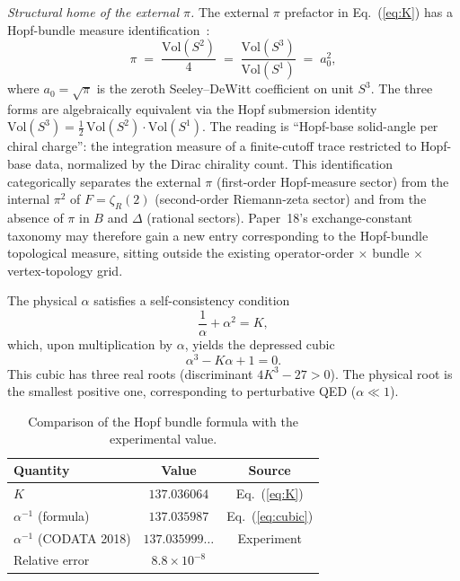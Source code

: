 \documentclass[aps,prl,twocolumn,superscriptaddress]{revtex4-2}
\begin{document}
\emph{Structural home of the external $\pi$.} The external $\pi$
prefactor in Eq.~(\ref{eq:K}) has a Hopf-bundle measure
identification~\cite{alpha_sprint_a_memo}:
\begin{equation}\label{eq:pi_hopf_measure}
  \pi \;=\; \frac{\mathrm{Vol}(S^2)}{4}
         \;=\; \frac{\mathrm{Vol}(S^3)}{\mathrm{Vol}(S^1)}
         \;=\; a_0^{2},
\end{equation}
where $a_0 = \sqrt{\pi}$ is the zeroth Seeley--DeWitt coefficient on
unit $S^3$. The three forms are algebraically equivalent via the
Hopf submersion identity
$\mathrm{Vol}(S^3) = \tfrac{1}{2}\,\mathrm{Vol}(S^2) \cdot \mathrm{Vol}(S^1)$.
The reading is ``Hopf-base solid-angle per chiral charge'': the
integration measure of a finite-cutoff trace restricted to Hopf-base
data, normalized by the Dirac chirality count. This identification
categorically separates the external $\pi$ (first-order Hopf-measure
sector) from the internal $\pi^2$ of $F = \zeta_R(2)$ (second-order
Riemann-zeta sector) and from the absence of $\pi$ in $B$ and
$\Delta$ (rational sectors). Paper~18's exchange-constant taxonomy
may therefore gain a new entry corresponding to the Hopf-bundle
topological measure, sitting outside the existing operator-order
$\times$ bundle $\times$ vertex-topology grid.

The physical $\alpha$ satisfies a self-consistency condition
\begin{equation}\label{eq:selfconsistent}
  \frac{1}{\alpha} + \alpha^2 = K,
\end{equation}
which, upon multiplication by $\alpha$, yields the depressed cubic
\begin{equation}\label{eq:cubic}
  \boxed{\alpha^3 - K\alpha + 1 = 0.}
\end{equation}
This cubic has three real roots (discriminant $4K^3 - 27 > 0$). The
physical root is the smallest positive one, corresponding to
perturbative QED ($\alpha \ll 1$).

\begin{table}[h]
\centering
\begin{tabular}{lcc}
\hline\hline
Quantity & Value & Source \\
\hline
$K$ & $137.036064$ & Eq.~(\ref{eq:K}) \\
$\alpha^{-1}$ (formula) & $137.035987$ & Eq.~(\ref{eq:cubic}) \\
$\alpha^{-1}$ (CODATA 2018) & $137.035999\ldots$ & Experiment \\
\hline
Relative error & $8.8 \times 10^{-8}$ & \\
\hline\hline
\end{tabular}
\caption{Comparison of the Hopf bundle formula with the experimental
value.}
\label{tab:comparison}
\end{table}
\end{document}
